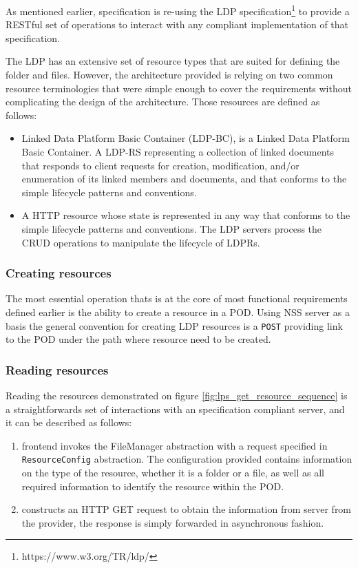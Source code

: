 As mentioned earlier, \solid{} specification is re-using the LDP specification\footnote{https://www.w3.org/TR/ldp/} to provide a RESTful set of operations to interact with any compliant implementation of that specification. 

The LDP has an extensive set of resource types that are suited for defining the folder and files. However, the architecture provided is relying on two common resource terminologies that were simple enough to cover the requirements without complicating the design of the architecture. Those resources are defined as follows:

\begin{itemize}
 	\item Linked Data Platform Basic Container (LDP-BC), is a Linked Data Platform Basic Container. A LDP-RS representing a collection of linked documents that responds to client requests for creation, modification, and/or enumeration of its linked members and documents, and that conforms to the simple lifecycle patterns and conventions.
	\item A HTTP resource whose state is represented in any way that conforms to the simple lifecycle patterns and conventions. The LDP servers process the CRUD operations to manipulate the lifecycle of LDPRs.
\end{itemize}


\subsubsection{Creating resources}

The most essential operation thats is at the core of most functional requirements defined earlier is the ability to create a resource in a POD. Using NSS server as a basis the general convention for creating LDP resources is a \texttt{POST} providing link to the POD under the path where resource need to be created. 

\subsubsection{Reading resources}

Reading the resources demonstrated on figure \ref{fig:lps_get_resource_sequence} is a straightforwards set of interactions with an \solid{} specification compliant server, and it can be described as follows:

\begin{enumerate}
    \item \lpa{} frontend invokes the FileManager abstraction with a request specified in \texttt{ResourceConfig} abstraction. The configuration provided contains information on the type of the resource, whether it is a folder or a file, as well as all required information to identify the resource within the POD.
    \item \lpas{} constructs an HTTP GET request to obtain the information from \solid{} server from the provider, the response is simply forwarded in asynchronous fashion.
\end{enumerate}

